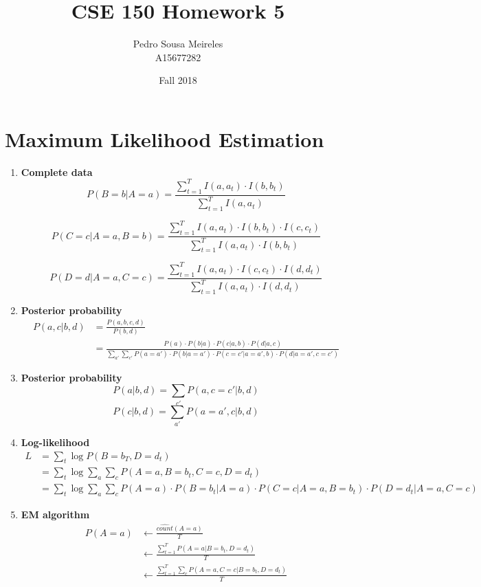 \documentclass[11]{article}
\title{CSE 150 Homework 5}
\date{Fall 2018}
\author{Pedro Sousa Meireles\\ A15677282}
\begin{document}
\maketitle
\section{Maximum Likelihood Estimation}
\begin{enumerate}[label=(\alph*)]
\item{\textbf{Complete data}}
$$P(B=b|A=a)=\frac{\sum_{t=1}^T I(a,a_t) \cdot I(b,b_t)}{\sum_{t=1}^T I(a,a_t)}$$

$$P(C=c|A=a,B=b)=\frac{\sum_{t=1}^T I(a,a_t) \cdot I(b,b_t) \cdot I(c,c_t)}{\sum_{t=1}^T I(a,a_t) \cdot I(b,b_t)}$$

$$P(D=d|A=a,C=c)=\frac{\sum_{t=1}^T I(a,a_t) \cdot I(c,c_t) \cdot I(d,d_t)}{\sum_{t=1}^T I(a,a_t) \cdot I(d,d_t)}$$

\item{\textbf{Posterior probability}}
\begin{align*}
P(a,c|b,d)&=\frac{P(a,b,c,d)}{P(b,d)}\\
&=\frac{P(a) \cdot P(b|a) \cdot P(c|a,b) \cdot P(d|a,c)}{\sum_{a'} \sum_{c'} P(a=a') \cdot P(b|a=a') \cdot P(c=c'|a=a',b) \cdot P(d|a=a',c=c')}
\end{align*}

\item{\textbf{Posterior probability}}
$$P(a|b,d)=\sum_{c'} P(a,c=c'|b,d)$$
$$P(c|b,d)=\sum_{a'} P(a=a',c|b,d)$$

\item{\textbf{Log-likelihood}}
\begin{align*}
L&=\sum_t \log{P(B=b_T,D=d_t)}\\
&=\sum_t \log{\sum_a \sum_c P(A=a,B=b_t,C=c,D=d_t)} \\
&=\sum_t \log{\sum_a \sum_c P(A=a) \cdot P(B=b_t|A=a) \cdot P(C=c|A=a, B=b_t) \cdot P(D=d_t|A=a,C=c)}
\end{align*}

\item{\textbf{EM algorithm}}
\begin{align*}
P(A=a) &\longleftarrow \frac{\widehat{count}(A=a)}{T}\\
&\longleftarrow \frac{\sum_{t=1}^T P(A=a|B=b_t,D=d_t)}{T}\\
&\longleftarrow \frac{\sum_{t=1}^T \sum_c P(A=a,C=c|B=b_t,D=d_t)}{T}
\end{align*}


\end{enumerate}
\end{document}
